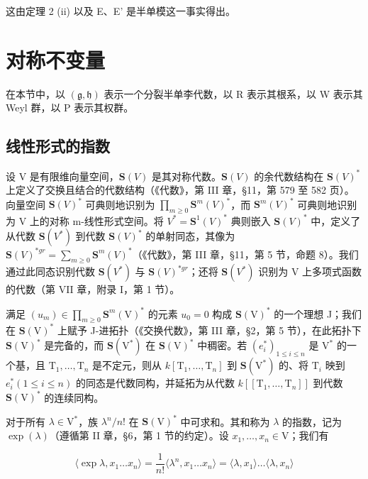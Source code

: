 这由定理 2 (ii) 以及 E、E' 是半单模这一事实得出。

\section{对称不变量}

在本节中，以 \((\mathfrak{g},\mathfrak{h})\) 表示一个分裂半单李代数，以 R 表示其根系，以 W 表示其 Weyl 群，以 P 表示其权群。

\subsection{线性形式的指数}

设 V 是有限维向量空间，\(\mathbf{S}(V)\) 是其对称代数。\(\mathbf{S}(V)\) 的余代数结构在 \(\mathbf{S}(V)^{*}\) 上定义了交换且结合的代数结构（《代数》，第 III 章，§11，第 579 至 582 页）。向量空间 \(\mathbf{S}(V)^{*}\) 可典则地识别为 \(\prod_{m\geq0}\mathbf{S}^{m}(V)^{*}\)，而 \(\mathbf{S}^{m}(V)^{*}\) 可典则地识别为 V 上的对称 m-线性形式空间。将 \(V^{*}=\mathbf{S}^{1}(V)^{*}\) 典则嵌入 \(\mathbf{S}(V)^{*}\) 中，定义了从代数 \(\mathbf{S}(V^{*})\) 到代数 \(\mathbf{S}(V)^{*}\) 的单射同态，其像为 \(\mathbf{S}(V)^{*gr}=\sum_{m\geq0}\mathbf{S}^{m}(V)^{*}\)（《代数》，第 III 章，§11，第 5 节，命题 8）。我们通过此同态识别代数 \(\mathbf{S}(V^{*})\) 与 \(\mathbf{S}(V)^{*gr}\)；还将 \(\mathbf{S}(V^{*})\) 识别为 V 上多项式函数的代数（第 VII 章，附录 I，第 1 节）。

满足 \((u_m) \in \prod_{m \geq 0} \mathbf{S}^m(\mathrm{V})^*\) 的元素 \(u_0 = 0\) 构成 \(\mathbf{S}(\mathrm{V})^*\) 的一个理想 J；我们在 \(\mathbf{S}(\mathrm{V})^*\) 上赋予 J-进拓扑（《交换代数》，第 III 章，§2，第 5 节），在此拓扑下 \(\mathbf{S}(\mathrm{V})^*\) 是完备的，而 \(\mathbf{S}(\mathrm{V}^*)\) 在 \(\mathbf{S}(\mathrm{V})^*\) 中稠密。若 \((e_i^*)_{1 \leq i \leq n}\) 是 \(\mathrm{V}^*\) 的一个基，且 \(\mathrm{T}_1, \ldots, \mathrm{T}_n\) 是不定元，则从 \(k[\mathrm{T}_1, \ldots, \mathrm{T}_n]\) 到 \(\mathbf{S}(\mathrm{V}^*)\) 的、将 \(\mathrm{T}_i\) 映到 \(e_i^*(1 \leq i \leq n)\) 的同态是代数同构，并延拓为从代数 \(k[[\mathrm{T}_1, \ldots, \mathrm{T}_n]]\) 到代数 \(\mathbf{S}(\mathrm{V})^*\) 的连续同构。

对于所有 \(\lambda \in \mathrm{V}^*\)，族 \(\lambda^n / n!\) 在 \(\mathbf{S}(\mathrm{V})^*\) 中可求和。其和称为 \(\lambda\) 的指数，记为 \(\exp(\lambda)\)（遵循第 II 章，§6，第 1 节的约定）。设 \(x_1, \ldots, x_n \in \mathrm{V}\)；我们有

\[
\langle \exp \lambda , x _ {1} \dots x _ {n} \rangle = \frac {1}{n !} \langle \lambda^ {n}, x _ {1} \dots x _ {n} \rangle = \langle \lambda , x _ {1} \rangle \dots \langle \lambda , x _ {n} \rangle
\]

